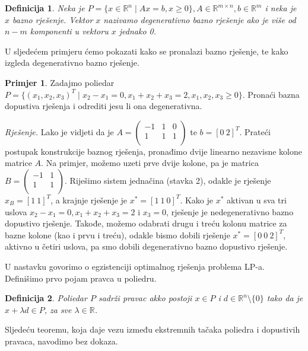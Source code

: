 \documentclass[a4paper, utf8, 11pt, colorlinks]{book}
\newtheorem{definition}{Definicija}[chapter]
\theoremstyle{definition}
\newtheorem{primjer}{Primjer}[chapter]
\begin{document}
\begin{definition}
      Neka je $P = \{ x \in \mathbb{R}^n \mid A x = b, x \geq 0\}, A \in \mathbb{R}^{m \times n}, b \in \mathbb{R}^m$    i neka je $x$ bazno rješenje. Vektor $x$ nazivamo degenerativno bazno rješenje ako je više od $n-m$ komponenti u vektoru $x$   jednako 0.
\end{definition}
U sljedećem primjeru ćemo pokazati kako se pronalazi bazno rješenje, te kako izgleda degenerativno bazno rješenje.

\begin{primjer} Zadajmo poliedar $P= \{ (x_1,x_2,x_3)^T \mid x_2 - x_1 = 0, x_1 + x_2 +   x_3 = 2, x_1,x_2,x_3 \geq 0 \}$.  Pronaći bazna dopustiva rješenja i odrediti jesu li ona degenerativna. 
\end{primjer}

\emph{Rješenje.} Lako je vidjeti da je  
$A=\left (\begin{array}{ccc}
   -1  &  1 & 0  \\
   1  &  1 & 1 \\
\end{array} \right )$ te $b = [0\ 2]^T$. Prateći postupak konstrukcije baznog rješenja, pronađimo dvije linearno nezavisne kolone matrice $A$. Na primjer, možemo uzeti prve dvije kolone, pa je matrica $B=\left (\begin{array}{cc}
   -1  & 1    \\
   1  &  1   \\
\end{array} \right ) .$ Riješimo sistem jednačina (stavka 2), odakle je rješenje $x_B = [1\ 1]^T$, a krajnje rješenje je $x^* = [1\ 1\ 0]^T$. Kako je 
$x^*$ aktivan u sva tri uslova $x_2 - x_1 = 0, x_1 + x_2 +  x_3 = 2$ i $x_3 = 0$, rješenje je nedegenerativno bazno dopustivo rješenje.  Takođe, možemo odabrati drugu i treću kolonu matrice za bazne kolone (kao i prvu i treću), odakle bismo dobili rješenje $x^* = [0\ 0\ 2]^T$, aktivno u četiri uslova, pa smo dobili degenerativno bazno dopustivo rješenje. 


U nastavku govorimo o egzistenciji optimalnog rješenja problema LP-a. Definišimo prvo pojam pravca u poliedru.

\begin{definition}
      Poliedar $P$ sadrži pravac akko postoji $x \in P$ i $d \in \mathbb{R}^n \setminus \{0\}$ tako da je $x + \lambda d \in P$, za sve $\lambda \in \mathbb{R}$. 
\end{definition}

Sljedeću teoremu, koja daje vezu između ekstremnih tačaka poliedra i dopustivih pravaca, navodimo bez dokaza.
\end{document}
